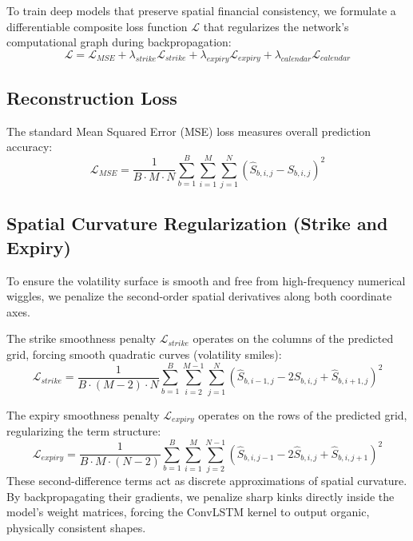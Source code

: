 \documentclass[conference]{IEEEtran}
\begin{document}
To train deep models that preserve spatial financial consistency, we formulate a differentiable composite loss function $\mathcal{L}$ that regularizes the network's computational graph during backpropagation:
\begin{equation}
\mathcal{L} = \mathcal{L}_{MSE} + \lambda_{strike} \mathcal{L}_{strike} + \lambda_{expiry} \mathcal{L}_{expiry} + \lambda_{calendar} \mathcal{L}_{calendar}
\end{equation}

\subsection{Reconstruction Loss}
The standard Mean Squared Error (MSE) loss measures overall prediction accuracy:
\begin{equation}
\mathcal{L}_{MSE} = \frac{1}{B \cdot M \cdot N} \sum_{b=1}^B \sum_{i=1}^M \sum_{j=1}^N \left(\hat{S}_{b,i,j} - S_{b,i,j}\right)^2
\end{equation}

\subsection{Spatial Curvature Regularization (Strike and Expiry)}
To ensure the volatility surface is smooth and free from high-frequency numerical wiggles, we penalize the second-order spatial derivatives along both coordinate axes. 

The strike smoothness penalty $\mathcal{L}_{strike}$ operates on the columns of the predicted grid, forcing smooth quadratic curves (volatility smiles):
\begin{equation}
\mathcal{L}_{strike} = \frac{1}{B \cdot (M-2) \cdot N} \sum_{b=1}^B \sum_{i=2}^{M-1} \sum_{j=1}^N \left(\hat{S}_{b,i-1,j} - 2\hat{S}_{b,i,j} + \hat{S}_{b,i+1,j}\right)^2
\end{equation}

The expiry smoothness penalty $\mathcal{L}_{expiry}$ operates on the rows of the predicted grid, regularizing the term structure:
\begin{equation}
\mathcal{L}_{expiry} = \frac{1}{B \cdot M \cdot (N-2)} \sum_{b=1}^B \sum_{i=1}^M \sum_{j=2}^{N-1} \left(\hat{S}_{b,i,j-1} - 2\hat{S}_{b,i,j} + \hat{S}_{b,i,j+1}\right)^2
\end{equation}
These second-difference terms act as discrete approximations of spatial curvature. By backpropagating their gradients, we penalize sharp kinks directly inside the model's weight matrices, forcing the ConvLSTM kernel to output organic, physically consistent shapes.
\end{document}
